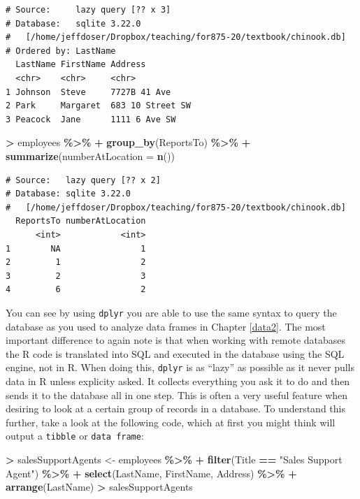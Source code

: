 \documentclass[
]{krantz}
\makeatletter
\newenvironment{Shaded}{\begin{snugshade}}{\end{snugshade}}
\newcommand{\DataTypeTok}[1]{\textcolor[rgb]{0.27,0.27,0.27}{#1}}
\newcommand{\KeywordTok}[1]{\textcolor[rgb]{0.27,0.27,0.27}{\textbf{#1}}}
\newcommand{\NormalTok}[1]{#1}
\newcommand{\OperatorTok}[1]{\textcolor[rgb]{0.43,0.43,0.43}{\textbf{#1}}}
\newcommand{\StringTok}[1]{\textcolor[rgb]{0.5,0.5,0.5}{#1}}
\newenvironment{kframe}{%
\medskip{}
\setlength{\fboxsep}{.8em}
 \def\at@end@of@kframe{}%
 \ifinner\ifhmode%
  \def\at@end@of@kframe{\end{minipage}}%
  \begin{minipage}{\columnwidth}%
 \fi\fi%
 \def\FrameCommand##1{\hskip\@totalleftmargin \hskip-\fboxsep
 \colorbox{shadecolor}{##1}\hskip-\fboxsep
     \hskip-\linewidth \hskip-\@totalleftmargin \hskip\columnwidth}%
 \MakeFramed {\advance\hsize-\width
   \@totalleftmargin\z@ \linewidth\hsize
   \@setminipage}}%
 {\par\unskip\endMakeFramed%
 \at@end@of@kframe}
\renewenvironment{Shaded}{\begin{kframe}}{\end{kframe}}
\makeatother
\begin{document}
\begin{verbatim}
# Source:     lazy query [?? x 3]
# Database:   sqlite 3.22.0
#   [/home/jeffdoser/Dropbox/teaching/for875-20/textbook/chinook.db]
# Ordered by: LastName
  LastName FirstName Address         
  <chr>    <chr>     <chr>           
1 Johnson  Steve     7727B 41 Ave    
2 Park     Margaret  683 10 Street SW
3 Peacock  Jane      1111 6 Ave SW   
\end{verbatim}

\begin{Shaded}
\begin{Highlighting}[]
\OperatorTok{\textgreater{}}\StringTok{ }\NormalTok{employees }\OperatorTok{\%\textgreater{}\%}\StringTok{ }
\OperatorTok{+}\StringTok{   }\KeywordTok{group\_by}\NormalTok{(ReportsTo) }\OperatorTok{\%\textgreater{}\%}\StringTok{ }
\OperatorTok{+}\StringTok{   }\KeywordTok{summarize}\NormalTok{(}\DataTypeTok{numberAtLocation =} \KeywordTok{n}\NormalTok{())}
\end{Highlighting}
\end{Shaded}

\begin{verbatim}
# Source:   lazy query [?? x 2]
# Database: sqlite 3.22.0
#   [/home/jeffdoser/Dropbox/teaching/for875-20/textbook/chinook.db]
  ReportsTo numberAtLocation
      <int>            <int>
1        NA                1
2         1                2
3         2                3
4         6                2
\end{verbatim}

You can see by using \texttt{dplyr} you are able to use the same syntax to query the database as you used to analyze data frames in Chapter \ref{data2}. The most important difference to again note is that when working with remote databases the R code is translated into SQL and executed in the database using the SQL engine, not in R. When doing this, \texttt{dplyr} is as ``lazy'' as possible as it never pulls data in R unless explicity asked. It collects everything you ask it to do and then sends it to the database all in one step. This is often a very useful feature when desiring to look at a certain group of records in a database. To understand this further, take a look at the following code, which at first you might think will output a \texttt{tibble} or \texttt{data\ frame}:

\begin{Shaded}
\begin{Highlighting}[]
\OperatorTok{\textgreater{}}\StringTok{ }\NormalTok{salesSupportAgents \textless{}{-}}\StringTok{ }\NormalTok{employees }\OperatorTok{\%\textgreater{}\%}\StringTok{ }
\OperatorTok{+}\StringTok{   }\KeywordTok{filter}\NormalTok{(Title }\OperatorTok{==}\StringTok{ "Sales Support Agent"}\NormalTok{) }\OperatorTok{\%\textgreater{}\%}\StringTok{ }
\OperatorTok{+}\StringTok{   }\KeywordTok{select}\NormalTok{(LastName, FirstName, Address) }\OperatorTok{\%\textgreater{}\%}\StringTok{ }
\OperatorTok{+}\StringTok{   }\KeywordTok{arrange}\NormalTok{(LastName) }
\OperatorTok{\textgreater{}}\StringTok{ }\NormalTok{salesSupportAgents}
\end{Highlighting}
\end{Shaded}
\end{document}
